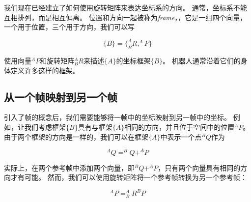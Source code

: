 我们现在已经建立了如何使用旋转矩阵来表达坐标系的方向。 通常，坐标系不能互相排列，而是相互偏离。 位置和方向一起被称为\emph {frame}，，它是一组四个向量，一个用于位置，三个用于方向，我们可以写

\begin{equation}
\{B\}=\{^A_BR, ^AP\}
\end{equation}
%

使用向量$ ^ AP $和旋转矩阵$ ^ A_BR $来描述$ \{A \} $的坐标框架$ \{B \} $。 机器人通常沿着它们的身体定义许多这样的框架。

\subsection{从一个帧映射到另一个帧}


引入了帧的概念后，我们需要能够将一帧中的坐标映射到另一帧中的坐标。 例如，让我们考虑框架$ \{B \} $具有与框架$ \{A \} $相同的方向，并且位于空间中的位置$ ^ AP $。 由于两个框架的方向是一样的，我们可以在框架$ \{A \} $中表示一个点$ ^ BQ $作为

%
\begin{equation}
^AQ=^BQ+^AP
\end{equation}
%

实际上，在两个参考帧中添加两个向量，即$ ^ BQ + ^ AP $，只有两个向量具有相同的方向才有可能。 然而，我们可以使用旋转矩阵将一个参考帧转换为另一个参考帧：

\begin{equation}
^AP=^A_BR^BP
\end{equation}
%

